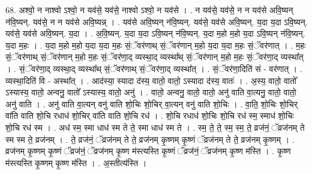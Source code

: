 \documentclass[17pt]{extarticle}
\begin{document}
68. अश्वो॒ न नाश्वो ऽश्वो॒ न यव॑से॒ यव॑से॒ नाश्वो ऽश्वो॒ न यव॑से । . न यव॑से॒ यव॑से॒ न न यव॑से अवि॒ष्यन् न॑वि॒ष्यन्. यव॑से॒ न न यव॑से अवि॒ष्यन्न् । . यव॑से अवि॒ष्यन् न॑वि॒ष्यन्. यव॑से॒ यव॑से अवि॒ष्यन्. य॒दा य॒दा ऽवि॒ष्यन्. यव॑से॒ यव॑से अवि॒ष्यन्. य॒दा । . अ॒वि॒ष्यन्. य॒दा य॒दा ऽवि॒ष्यन् न॑वि॒ष्यन्. य॒दा म॒हो म॒हो य॒दा ऽवि॒ष्यन् न॑वि॒ष्यन्. य॒दा म॒हः । . य॒दा म॒हो म॒हो य॒दा य॒दा म॒हः सं॒ॅवर॑णाथ् सं॒ॅवर॑णान् म॒हो य॒दा य॒दा म॒हः सं॒ॅवर॑णात् । . म॒हः सं॒ॅवर॑णाथ् सं॒ॅवर॑णान् म॒हो म॒हः सं॒ॅवर॑णा॒द् व्यस्था॒द् व्यस्था᳚थ् सं॒ॅवर॑णान् म॒हो म॒हः सं॒ॅवर॑णा॒द् व्यस्था᳚त् । . सं॒ॅवर॑णा॒द् व्यस्था॒द् व्यस्था᳚थ् सं॒ॅवर॑णाथ् सं॒ॅवर॑णा॒द् व्यस्था᳚त् । . सं॒ॅवर॑णा॒दिति॑ सं - वर॑णात् । . व्यस्था॒दिति॑ वि - अस्था᳚त् । . आद॑स्या॒ स्यादा द॑स्य॒ वातो॒ वातो॒ ऽस्यादा द॑स्य॒ वातः॑ । . अ॒स्य॒ वातो॒ वातो᳚ ऽस्यास्य॒ वातो॒ अन्वनु॒ वातो᳚ ऽस्यास्य॒ वातो॒ अनु॑ । . वातो॒ अन्वनु॒ वातो॒ वातो॒ अनु॑ वाति वा॒त्यनु॒ वातो॒ वातो॒ अनु॑ वाति । . अनु॑ वाति वा॒त्यन् वनु॑ वाति शो॒चिः शो॒चिर् वा॒त्यन् वनु॑ वाति शो॒चिः । . वा॒ति॒ शो॒चिः शो॒चिर् वा॑ति वाति शो॒चि रधाध॑ शो॒चिर् वा॑ति वाति शो॒चि रध॑ । . शो॒चि रधाध॑ शो॒चिः शो॒चि रध॑ स्म॒ स्माध॑ शो॒चिः शो॒चि रध॑ स्म । . अध॑ स्म॒ स्मा धाध॑ स्म ते ते॒ स्मा धाध॑ स्म ते । . स्म॒ ते॒ ते॒ स्म॒ स्म॒ ते॒ व्रज॑नं॒ ॅव्रज॑नम् ते स्म स्म ते॒ व्रज॑नम् । . ते॒ व्रज॑नं॒ ॅव्रज॑नम् ते ते॒ व्रज॑नम् कृ॒ष्णम् कृ॒ष्णं ॅव्रज॑नम् ते ते॒ व्रज॑नम् कृ॒ष्णम् । . व्रज॑नम् कृ॒ष्णम् कृ॒ष्णं ॅव्रज॑नं॒ ॅव्रज॑नम् कृ॒ष्ण म॑स्त्यस्ति कृ॒ष्णं ॅव्रज॑नं॒ ॅव्रज॑नम् कृ॒ष्ण म॑स्ति । . कृ॒ष्ण म॑स्त्यस्ति कृ॒ष्णम् कृ॒ष्ण म॑स्ति । . अ॒स्तीत्य॑स्ति । \newline
\pagebreak
{}
\end{document}
